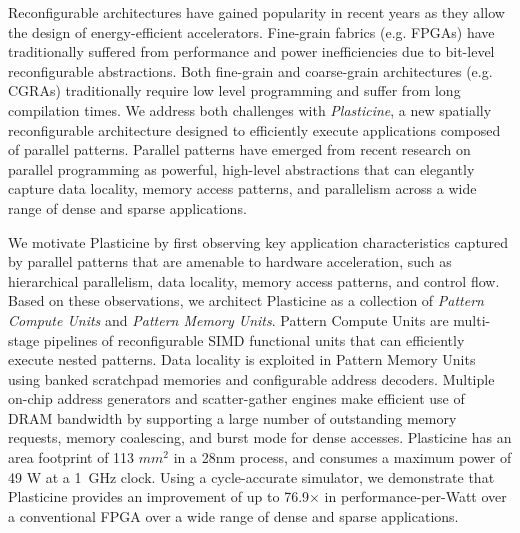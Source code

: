 Reconfigurable architectures have gained popularity in recent years as they allow the design of energy-efficient accelerators. Fine-grain fabrics (e.g. FPGAs) have traditionally suffered from performance and power inefficiencies due to bit-level reconfigurable abstractions. Both fine-grain and coarse-grain architectures (e.g. CGRAs) traditionally require low level programming and suffer from long compilation times. We address both challenges with {\it Plasticine}, a new spatially reconfigurable architecture designed to efficiently execute applications composed of parallel patterns. Parallel patterns have emerged from recent research on parallel programming as powerful, high-level abstractions that can elegantly capture data locality, memory access patterns, and parallelism across a wide range of dense and sparse applications.

We motivate Plasticine by first observing key application characteristics captured by parallel
patterns that are amenable to hardware acceleration, such as hierarchical parallelism, data
locality, memory access patterns, and control flow. Based on these observations, we architect
Plasticine as a collection of \emph{Pattern Compute Units} and \emph{Pattern Memory Units}. Pattern Compute
Units are multi-stage pipelines of reconfigurable SIMD functional units that can efficiently execute
nested patterns. Data locality is exploited in Pattern Memory Units using banked scratchpad memories and
configurable address decoders. Multiple on-chip address generators and scatter-gather engines make efficient use of DRAM
bandwidth by supporting a large number of outstanding memory requests, memory coalescing, and burst
mode for dense accesses.  Plasticine has an area footprint of 113 $mm^2$ in a 28nm process, and
consumes a maximum power of 49 W at a 1~GHz clock. Using a cycle-accurate simulator, we demonstrate that
Plasticine provides an improvement of up to 76.9$\times$ in performance-per-Watt over a conventional FPGA over a wide range of dense and sparse applications.
